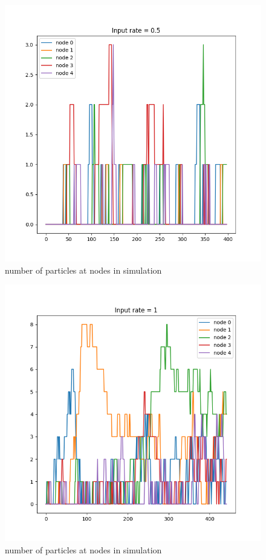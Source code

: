 \documentclass{article}
\begin{document}
\begin{figure}[!htbp]
    \centering
    \includegraphics[width=\linewidth]{fig/fix_half}   
    \caption{number of particles at nodes in simulation}
    \label{fig:figure7}
\end{figure}

\begin{figure}[!htbp]
    \centering
    \includegraphics[width=\linewidth]{fig/fix_1}   
    \caption{number of particles at nodes in simulation}
    \label{fig:figure8}
\end{figure}
\end{document}
